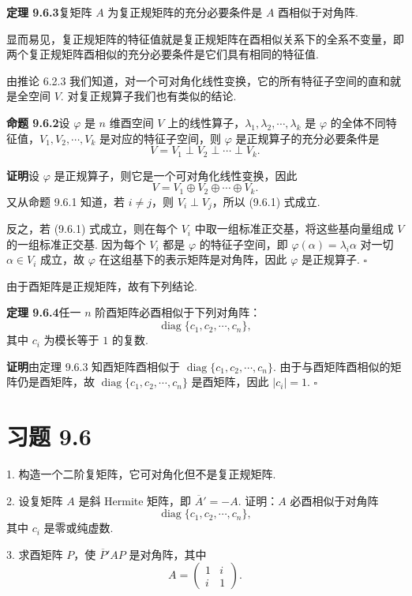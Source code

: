 \documentclass[UTF8,12pt,a4paper,fontset=fandol]{ctexart}
\begin{document}
\noindent\textbf{定理 9.6.3}\quad 复矩阵 $A$ 为复正规矩阵的充分必要条件是 $A$ 酉相似于对角阵.

显而易见，复正规矩阵的特征值就是复正规矩阵在酉相似关系下的全系不变量，即两个复正规矩阵酉相似的充分必要条件是它们具有相同的特征值.

由推论 6.2.3 我们知道，对一个可对角化线性变换，它的所有特征子空间的直和就是全空间 $V$. 对复正规算子我们也有类似的结论.

\noindent\textbf{命题 9.6.2}\quad 设 $\varphi$ 是 $n$ 维酉空间 $V$ 上的线性算子，$\lambda_1,\lambda_2,\cdots,\lambda_k$ 是 $\varphi$ 的全体不同特征值，$V_1,V_2,\cdots,V_k$ 是对应的特征子空间，则 $\varphi$ 是正规算子的充分必要条件是
\begin{equation}
  V=V_1\perp V_2\perp\cdots\perp V_k.
  \tag{9.6.1}
\end{equation}

\noindent\textbf{证明}\quad 设 $\varphi$ 是正规算子，则它是一个可对角化线性变换，因此
\[
  V=V_1\oplus V_2\oplus\cdots\oplus V_k.
\]
又从命题 9.6.1 知道，若 $i\ne j$，则 $V_i\perp V_j$，所以 (9.6.1) 式成立.

反之，若 (9.6.1) 式成立，则在每个 $V_i$ 中取一组标准正交基，将这些基向量组成 $V$ 的一组标准正交基. 因为每个 $V_i$ 都是 $\varphi$ 的特征子空间，即 $\varphi(\alpha)=\lambda_i\alpha$ 对一切 $\alpha\in V_i$ 成立，故 $\varphi$ 在这组基下的表示矩阵是对角阵，因此 $\varphi$ 是正规算子. $\square$

由于酉矩阵是正规矩阵，故有下列结论.

\noindent\textbf{定理 9.6.4}\quad 任一 $n$ 阶酉矩阵必酉相似于下列对角阵：
\[
  \operatorname{diag}\{c_1,c_2,\cdots,c_n\},
\]
其中 $c_i$ 为模长等于 $1$ 的复数.

\noindent\textbf{证明}\quad 由定理 9.6.3 知酉矩阵酉相似于 $\operatorname{diag}\{c_1,c_2,\cdots,c_n\}$. 由于与酉矩阵酉相似的矩阵仍是酉矩阵，故 $\operatorname{diag}\{c_1,c_2,\cdots,c_n\}$ 是酉矩阵，因此 $|c_i|=1$. $\square$

\section*{习题 9.6}

1. 构造一个二阶复矩阵，它可对角化但不是复正规矩阵.

2. 设复矩阵 $A$ 是斜 Hermite 矩阵，即 $\overline A'=-A$. 证明：$A$ 必酉相似于对角阵
\[
  \operatorname{diag}\{c_1,c_2,\cdots,c_n\},
\]
其中 $c_i$ 是零或纯虚数.

3. 求酉矩阵 $P$，使 $\overline P'AP$ 是对角阵，其中
\[
  A=
  \left(\begin{array}{cc}
    1 & i\\
    i & 1
  \end{array}\right).
\]
\end{document}
